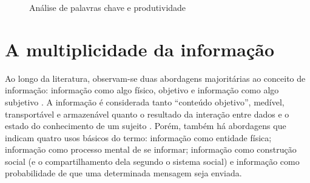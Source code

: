 \documentclass[a4paper,11pt]{article}
\begin{document}
\begin{figure}[hp]
\centering
{}
\caption{Análise de palavras chave e produtividade}
\label{fig:img1}
\end{figure}

\section{A multiplicidade da informação}

Ao longo da literatura, observam-se duas abordagens majoritárias ao conceito de informação: informação como algo físico, objetivo e informação como algo subjetivo \cite{fer}. 
A informação é considerada tanto “conteúdo objetivo”, medível, transportável e armazenável quanto o resultado da interação entre dados e o estado do conhecimento de um sujeito \cite{ara}.
Porém, também há abordagens que indicam quatro usos básicos do termo: informação como entidade física; informação como processo mental de se informar; informação como construção social (e o compartilhamento dela segundo o sistema social) e informação como probabilidade de que uma determinada mensagem seja enviada.
\end{document}
